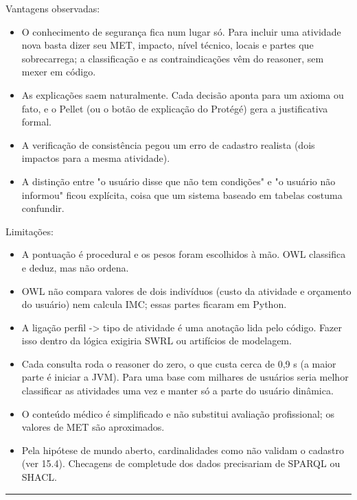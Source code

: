 \documentclass[12pt, a4paper]{article}
\providecommand{\tightlist}{%
  \setlength{\itemsep}{0pt}\setlength{\parskip}{0pt}}
\DeclareRobustCommand{\texttt}[1]{\breakabletexttt{#1}}
\begin{document}
Vantagens observadas:

\begin{itemize}
\tightlist
\item
  O conhecimento de segurança fica num lugar só. Para incluir uma atividade nova basta dizer seu MET, impacto, nível técnico, locais e partes que sobrecarrega; a classificação e as contraindicações vêm do reasoner, sem mexer em código.
\item
  As explicações saem naturalmente. Cada decisão aponta para um axioma ou fato, e o Pellet (ou o botão de explicação do Protégé) gera a justificativa formal.
\item
  A verificação de consistência pegou um erro de cadastro realista (dois impactos para a mesma atividade).
\item
  A distinção entre "o usuário disse que não tem condições" e "o usuário não informou" ficou explícita, coisa que um sistema baseado em tabelas costuma confundir.
\end{itemize}

Limitações:

\begin{itemize}
\tightlist
\item
  A pontuação é procedural e os pesos foram escolhidos à mão. OWL classifica e deduz, mas não ordena.
\item
  OWL não compara valores de dois indivíduos (custo da atividade e orçamento do usuário) nem calcula IMC; essas partes ficaram em Python.
\item
  A ligação perfil -> tipo de atividade é uma anotação lida pelo código. Fazer isso dentro da lógica exigiria SWRL ou artifícios de modelagem.
\item
  Cada consulta roda o reasoner do zero, o que custa cerca de 0,9 s (a maior parte é iniciar a JVM). Para uma base com milhares de usuários seria melhor classificar as atividades uma vez e manter só a parte do usuário dinâmica.
\item
  O conteúdo médico é simplificado e não substitui avaliação profissional; os valores de MET são aproximados.
\item
  Pela hipótese de mundo aberto, cardinalidades como \texttt{realizadaEm\ min\ 1\ Local} não validam o cadastro (ver 15.4). Checagens de completude dos dados precisariam de SPARQL ou SHACL.
\end{itemize}

\begin{center}\rule{0.5\linewidth}{0.5pt}\end{center}
\end{document}
